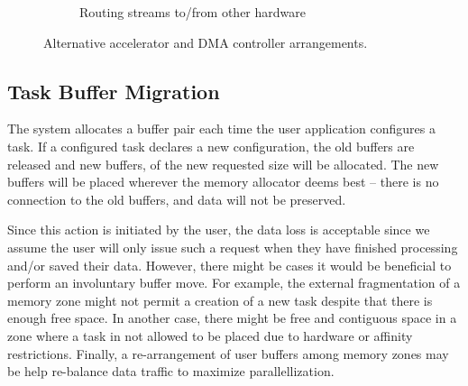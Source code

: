 \begin{figure}[tb!]
\begin{subfigure}[h]{0.6\textwidth}
\caption{Routing streams to/from other hardware}
\end{subfigure}
\caption{Alternative accelerator and DMA controller arrangements.}
\label{fig:alt-arrangements}
\end{figure}

\subsection{Task Buffer Migration}

The system allocates a buffer pair each time the user application configures a task. If a configured task
declares a new configuration, the old buffers are released and new buffers, of the new requested size will be allocated.
The new buffers will be placed wherever the memory allocator deems best -- there is no connection to the old buffers,
and data will not be preserved. 

Since this action is initiated by the user, the data loss is acceptable since we assume the user will only issue such a request
when they have finished processing and/or saved their data. However, there might be cases it would be beneficial to perform
an involuntary buffer move. For example, the external fragmentation of a memory zone might not permit a creation of a new
task despite that there is enough free space. In another case, there might be free and contiguous space in a zone where 
a task in not allowed to be placed due to hardware or affinity restrictions. 
Finally, a re-arrangement of user buffers among memory zones may be help re-balance data traffic to maximize parallellization.

